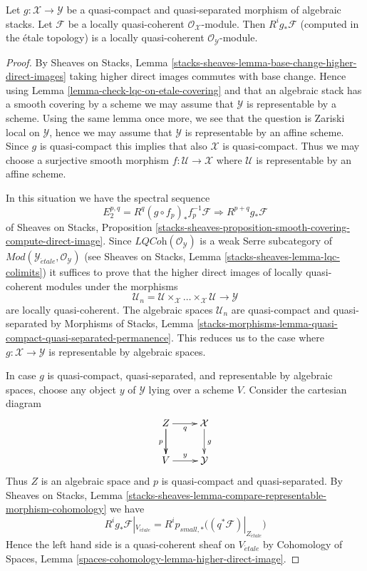 \begin{lemma}
\label{lemma-pushforward-locally-quasi-coherent}
Let $g : \mathcal{X} \to \mathcal{Y}$ be a quasi-compact and
quasi-separated morphism of algebraic stacks. Let 
$\mathcal{F}$ be a locally quasi-coherent
$\mathcal{O}_\mathcal{X}$-module. Then $R^ig_*\mathcal{F}$
(computed in the \'etale topology) is
a locally quasi-coherent $\mathcal{O}_\mathcal{Y}$-module.
\end{lemma}

\begin{proof}
By
Sheaves on Stacks, Lemma
\ref{stacks-sheaves-lemma-base-change-higher-direct-images}
taking higher direct images commutes with base change.
Hence using
Lemma \ref{lemma-check-lqc-on-etale-covering}
and that an algebraic stack has a smooth covering by
a scheme we may assume that $\mathcal{Y}$ is representable by a scheme.
Using the same lemma once more, we see that
the question is Zariski local on $\mathcal{Y}$, hence we may assume that
$\mathcal{Y}$ is representable by an affine scheme. Since $g$ is
quasi-compact this implies that also $\mathcal{X}$ is quasi-compact.
Thus we may choose a surjective smooth morphism
$f : \mathcal{U} \to \mathcal{X}$ where $\mathcal{U}$ is representable
by an affine scheme.

\medskip\noindent
In this situation we have the spectral sequence
$$
E_2^{p, q} = R^q(g \circ f_p)_*f_p^{-1}\mathcal{F}
\Rightarrow
R^{p + q}g_*\mathcal{F}
$$
of
Sheaves on Stacks, Proposition
\ref{stacks-sheaves-proposition-smooth-covering-compute-direct-image}.
Since $\textit{LQCoh}(\mathcal{O}_\mathcal{Y})$ is a weak Serre subcategory
of
$\textit{Mod}(\mathcal{Y}_{\acute{e}tale}, \mathcal{O}_\mathcal{Y})$
(see
Sheaves on Stacks, Lemma \ref{stacks-sheaves-lemma-lqc-colimits})
it suffices to prove that the higher direct images of locally
quasi-coherent modules under the morphisms
$$
\mathcal{U}_n =
\mathcal{U} \times_\mathcal{X} \ldots \times_\mathcal{X} \mathcal{U}
\longrightarrow
\mathcal{Y}
$$
are locally quasi-coherent. The algebraic spaces $\mathcal{U}_n$
are quasi-compact and quasi-separated by
Morphisms of Stacks, Lemma
\ref{stacks-morphisms-lemma-quasi-compact-quasi-separated-permanence}.
This reduces us to the case where $g : \mathcal{X} \to \mathcal{Y}$
is representable by algebraic spaces.

\medskip\noindent
In case $g$ is quasi-compact, quasi-separated, and representable by algebraic
spaces, choose any object $y$ of $\mathcal{Y}$ lying over a scheme $V$.
Consider the cartesian diagram
$$
\xymatrix{
Z \ar[d] \ar[r]_q \ar[d]_p & \mathcal{X} \ar[d]^g \\
V \ar[r]^y & \mathcal{Y}
}
$$
Thus $Z$ is an algebraic space and $p$ is quasi-compact and quasi-separated.
By Sheaves on Stacks, Lemma
\ref{stacks-sheaves-lemma-compare-representable-morphism-cohomology}
we have
$$
R^ig_*\mathcal{F}|_{V_{\acute{e}tale}} =
R^ip_{small, *}\big((q^*\mathcal{F})|_{Z_{\acute{e}tale}}\big)
$$
Hence the left hand side is a quasi-coherent sheaf on $V_{\acute{e}tale}$ by
Cohomology of Spaces, Lemma
\ref{spaces-cohomology-lemma-higher-direct-image}.
\end{proof}







